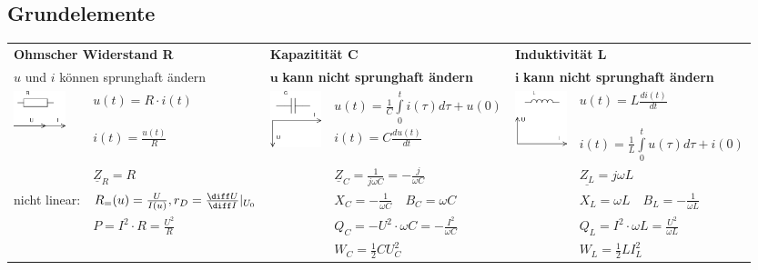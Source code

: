    	\subsection{Grundelemente}
   		\begin{tabular}{p{1.5cm} p{4.3cm} |p{1.5cm} p{4.3cm}| p{1.5cm} p{4.3cm}}
   	   		\multicolumn{2}{l}{\textbf{Ohmscher Widerstand R}}
   	   			& \multicolumn{2}{l}{\textbf{Kapazitität C}}
   	   			& \multicolumn{2}{l}{\textbf{Induktivität L}} \\
   	   		\multicolumn{2}{l}{$u$ und $i$ können sprunghaft ändern}
   	   			& \multicolumn{2}{l}{$\mathbf{u}$ \textbf{kann nicht sprunghaft ändern}}
   	   			& \multicolumn{2}{l}{$\mathbf{i}$ \textbf{kann nicht sprunghaft ändern}} \\
   	   	
   	   		\multirow{2}{1.5cm}{
   				\includegraphics[width=1.5cm]{./images/zeigerdiag-r.png}}
   				& $u(t) = R \cdot i(t)$ 
   				& \multirow{2}{1.5cm}{\includegraphics[width=1.5cm]{./images/zeigerdiag-c.png}}
   				& $u(t) = \frac{1}{C} \int\limits_0^t i(\tau) d\tau + u(0)$
   				& 
   				\multirow{2}{1.5cm}{\includegraphics[width=1.5cm]{./images/zeigerdiag-l.png}}
   				&$u(t) = L \frac{di(t)}{dt}$\\
   				
   				&$i(t) = \frac{u(t)}{R}$
   				& & $i(t) = C \frac{d u(t)}{dt}$
   				& & $i(t) = \frac{1}{L} \int\limits_0^t u(\tau) d\tau + i(0)$\\
   				
   				& $\underline{Z}_R = R$
   				& & $\underline{Z}_C = \frac{1}{j \omega C} = - \frac{j}{\omega C}$
   				& & $\underline{Z_L} = j \omega L$\\
   				
   				\parbox{1.7cm}{\small{nicht linear:}}
   				& $R_=(u) = \frac{U}{I(u)}, r_D = \frac{\diff U}{\diff I}\lvert_{U_0}$
   				& & $X_C = -\frac{1}{\omega C} \quad B_C = \omega C$
   	   			& & $X_L = \omega L
   	   			\quad B_L = -\frac{1}{\omega L}$ \\
   	   			
   	   			& $P=I^2 \cdot R = \frac{U^2}{R}$
   	   			& & $Q_C= - U^2 \cdot \omega C = - \frac{I^2}{\omega C}$
   	   			& & $Q_L= I^2 \cdot \omega L = \frac{U^2}{\omega L}$\\
   	   			
   	   			& & & $W_C=\frac12 C U_C^2$
   	   			& &$W_L=\frac12 L I_L^2$
   	   	\end{tabular}
   	
